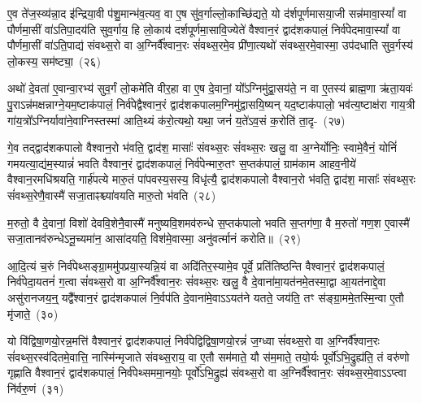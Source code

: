 ए॒व ते॑ज॒स्व्य॑न्ना॒द इ॑न्द्रिया॒वी प॑शु॒मान्भ॑व॒त्यव॒ वा ए॒ष सु॑व॒र्गाल्लो॒काच्छि॑द्यते॒ यो द॑र्\mbox{}शपूर्णमासया॒जी सन्न॑मावा॒स्यां᳚ वा पौर्णमा॒सीं वा॑\-ऽतिपा॒दय॑ति सुव॒र्गाय॒ हि लो॒काय॑ दर्\mbox{}श\-पूर्ण\-मा॒सावि॒ज्येते॑ वैश्वान॒रं द्वाद॑श\-कपालं॒ निर्व॑पेदमावा॒स्यां᳚ वा पौर्णमा॒सीं वा॑\-ऽति॒पाद्य॑ संवथ्स॒रो वा अ॒ग्निर्वै᳚श्वान॒रः सं॑वथ्स॒रमे॒व प्री॑णा॒त्यथो॑ संवथ्स॒रमे॒वास्मा॒ उप॑दधाति सुव॒र्गस्य॑ लो॒कस्य॒ सम॑ष्ट्या॒~(२६)

अथो॑ दे॒वता॑ ए॒वान्वा॒रभ्य॑ सुव॒र्गं लो॒कमे॑ति वीर॒हा वा ए॒ष दे॒वानां॒ यो᳚\-ऽग्निमु॑द्वा॒सय॑ते॒ न वा ए॒तस्य॑ ब्राह्म॒णा ऋ॑ता॒यवः॑ पु॒रा\-ऽन्न॑मक्षन्नाग्ने॒यम॒ष्टा\-क॑पालं॒ निर्व॑पेद्वैश्वान॒रं द्वाद॑श\-कपालम॒ग्नि\-मु॑द्वासयि॒ष्यन् यद॒ष्टाक॑पालो॒ भव॑त्य॒ष्टाक्ष॑रा गाय॒त्री गा॑य॒त्रो᳚\-ऽग्निर्यावा॑ने॒वाग्निस्तस्मा॑ आति॒थ्यं क॑रो॒त्यथो॒ यथा॒ जनं॑ य॒ते॑\-ऽव॒सं क॒रोति॑ ता॒दृ-~(२७)

गे॒व तद्द्वाद॑श\-कपालो वैश्वान॒रो भ॑वति॒ द्वाद॑श॒ मासाः᳚ संवथ्स॒रः सं॑वथ्स॒रः खलु॒ वा अ॒ग्नेर्योनिः॒ स्वामे॒वैनं॒ योनिं॑ गमयत्या॒द्य॑म॒स्यान्नं॑ भवति वैश्वान॒रं द्वाद॑श\-कपालं॒ निर्व॑पेन्मारु॒तꣳ स॒प्तक॑पालं॒ ग्राम॑काम आहव॒नीये॑ वैश्वान॒रमधि॑श्रयति॒ गार्\mbox{}ह॑पत्ये मारु॒तं पा॑पवस्य॒सस्य॒ विधृ॑त्यै॒ द्वाद॑श\-कपालो वैश्वान॒रो भ॑वति॒ द्वाद॑श॒ मासाः᳚ संवथ्स॒रः सं॑वथ्स॒रेणै॒वास्मै॑ सजा॒ताꣴश्च्या॑वयति मारु॒तो भ॑वति~(२८)

म॒रुतो॒ वै दे॒वानां॒ विशो॑ देववि॒शेनै॒वास्मै॑ मनुष्यवि॒शमव॑\-रुन्धे स॒प्तक॑पालो भवति स॒प्तग॑णा॒ वै म॒रुतो॑ गण॒श ए॒वास्मै॑ सजा॒तानव॑\-रुन्धे\-ऽनू॒च्यमा॑न॒ आसा॑दयति॒ विश॑मे॒वास्मा॒ अनु॑वर्त्मानं करोति॥~(२९)

{\anuvakamend[{प्र॒जाका॑मः संवथ्स॒रः पु॒नात्ये॒वैनं॑ पू॒तः सम॑ष्ट्यै ता॒दृङ्मा॑रु॒तो भ॑व॒त्येका॒न्नत्रि॒ꣳ॒शच्च॑}]}%

आ॒दि॒त्यं च॒रुं निर्व॑पेथ्सङ्ग्रा॒ममु॑पप्रया॒स्यन्नि॒यं वा अदि॑तिर॒स्या\-मे॒व पूर्वे॒ प्रति॑तिष्ठन्ति वैश्वान॒रं द्वाद॑श\-कपालं॒ निर्व॑पेदा॒यतनं॑ ग॒त्वा सं॑वथ्स॒रो वा अ॒ग्निर्वै᳚श्वान॒रः सं॑वथ्स॒रः खलु॒ वै दे॒वाना॑मा॒यत॑नमे॒तस्मा॒द्वा आ॒यत॑नाद्दे॒वा असु॑रानजय॒न्॒ यद्वै᳚श्वान॒रं द्वाद॑श\-कपालं नि॒र्वप॑ति दे॒वाना॑\-मे॒वा\-ऽऽ\-\-यत॑ने यतते॒ जय॑ति॒ तꣳ स॑ङ्ग्रा॒ममे॒तस्मि॒न्वा ए॒तौ मृ॑जाते॒~(३०)

यो वि॑द्विषा॒णयो॒रन्न॒मत्ति॑ वैश्वान॒रं द्वाद॑श\-कपालं॒ निर्व॑पेद्विद्विषा॒\-णयो॒रन्नं॑ ज॒ग्ध्वा सं॑वथ्स॒रो वा अ॒ग्निर्वै᳚श्वान॒रः सं॑वथ्स॒रस्व॑दितमे॒वात्ति॒ नास्मि॑न्मृजाते संवथ्स॒राय॒ वा ए॒तौ सम॑माते॒ यौ स॑म॒माते॒ तयो॒र्यः पूर्वो॑\-ऽभि॒द्रुह्य॑ति॒ तं वरु॑णो गृह्णाति वैश्वान॒रं द्वाद॑श\-कपालं॒ निर्व॑पेथ्सममा॒नयोः॒ पूर्वो॑\-ऽभि॒द्रुह्य॑ संवथ्स॒रो वा अ॒ग्निर्वै᳚श्वान॒रः सं॑वथ्स॒रमे॒वा\-ऽऽ\-प्त्वा नि॑र्वरु॒णं~(३१)

